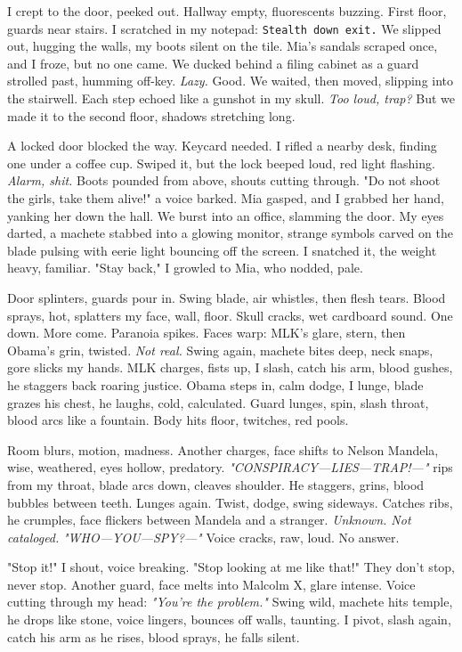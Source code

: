 \documentclass[12pt]{article}
\newcommand{\note}[1]{\texttt{#1}}
\begin{document}
I crept to the door, peeked out. Hallway empty, fluorescents buzzing. First floor, guards near stairs. I scratched in my notepad: \note{Stealth down exit.} We slipped out, hugging the walls, my boots silent on the tile. \textnormal{Mia}’s sandals scraped once, and I froze, but no one came. We ducked behind a filing cabinet as a guard strolled past, humming off-key. \textit{Lazy.} Good. We waited, then moved, slipping into the stairwell. Each step echoed like a gunshot in my skull. \textit{Too loud, trap?} But we made it to the second floor, shadows stretching long.

A locked door blocked the way. Keycard needed. I rifled a nearby desk, finding one under a coffee cup. Swiped it, but the lock beeped loud, red light flashing. \textit{Alarm, shit.} Boots pounded from above, shouts cutting through. "Do not shoot the girls, take them alive!" a voice barked. \textnormal{Mia} gasped, and I grabbed her hand, yanking her down the hall. We burst into an office, slamming the door. My eyes darted, a machete stabbed into a glowing monitor, strange symbols carved on the blade pulsing with eerie light bouncing off the screen. I snatched it, the weight heavy, familiar. "Stay back," I growled to \textnormal{Mia}, who nodded, pale.

Door splinters, guards pour in. Swing blade, air whistles, then flesh tears. Blood sprays, hot, splatters my face, wall, floor. Skull cracks, wet cardboard sound. One down. More come. Paranoia spikes. Faces warp: \textnormal{MLK}’s glare, stern, then \textnormal{Obama}’s grin, twisted. \textit{Not real.} Swing again, machete bites deep, neck snaps, gore slicks my hands. \textnormal{MLK} charges, fists up, I slash, catch his arm, blood gushes, he staggers back roaring justice. \textnormal{Obama} steps in, calm dodge, I lunge, blade grazes his chest, he laughs, cold, calculated. Guard lunges, spin, slash throat, blood arcs like a fountain. Body hits floor, twitches, red pools.

Room blurs, motion, madness. Another charges, face shifts to \textnormal{Nelson Mandela}, wise, weathered, eyes hollow, predatory. \textit{"CONSPIRACY—LIES—TRAP!—"} rips from my throat, blade arcs down, cleaves shoulder. He staggers, grins, blood bubbles between teeth. Lunges again. Twist, dodge, swing sideways. Catches ribs, he crumples, face flickers between \textnormal{Mandela} and a stranger. \textit{Unknown. Not cataloged.} \textit{"WHO—YOU—SPY?—"} Voice cracks, raw, loud. No answer.

"Stop it!" I shout, voice breaking. "Stop looking at me like that!" They don’t stop, never stop. Another guard, face melts into \textnormal{Malcolm X}, glare intense. Voice cutting through my head: \textit{"You’re the problem."} Swing wild, machete hits temple, he drops like stone, voice lingers, bounces off walls, taunting. I pivot, slash again, catch his arm as he rises, blood sprays, he falls silent.
\end{document}
